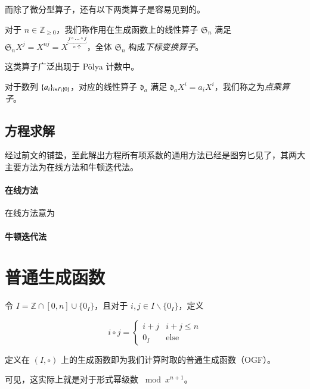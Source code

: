 而除了微分型算子，还有以下两类算子是容易见到的。

\begin{definition}[下标变换算子]
对于 $n\in \mathbb Z_{\ge 0}$，我们称作用在生成函数上的线性算子 $\mathfrak S_n$ 满足 $\mathfrak S_n X^j = X^{nj} = X^{\underbracket{j\circ \dots\circ j}_{\text{$n$ 个}}}$，全体 $\mathfrak S_n$ 构成\emph{下标变换算子}。
\end{definition}

这类算子广泛出现于 P\"olya 计数中。

\begin{definition}[点乘算子]
对于数列 $\{a_i\}_{i\in {I \backslash \{0\}}}$，对应的线性算子 $\mathfrak d_a$ 满足 $\mathfrak d_a X^i = a_iX^i$，我们称之为\emph{点乘算子}。
\end{definition}

\subsection{方程求解}

经过前文的铺垫，至此解出方程所有项系数的通用方法已经是图穷匕见了，其两大主要方法为在线方法和牛顿迭代法。

\paragraph{在线方法}

在线方法意为

\paragraph{牛顿迭代法}

\section{普通生成函数}

\begin{definition}[普通生成函数]
令 $I=\mathbb Z \cap [0, n] \cup \{0_I\}$，且对于 $i,j \in I\backslash\{0_I\}$，定义

$$
i\circ j =\begin{cases}
i + j & i + j \le n\\
0_I & \mathrm{else}
\end{cases}
$$

定义在 $(I,\circ)$ 上的生成函数即为我们计算时取的普通生成函数（OGF）。

\end{definition}

可见，这实际上就是对于形式幂级数 $\bmod x^{n+1}$。

